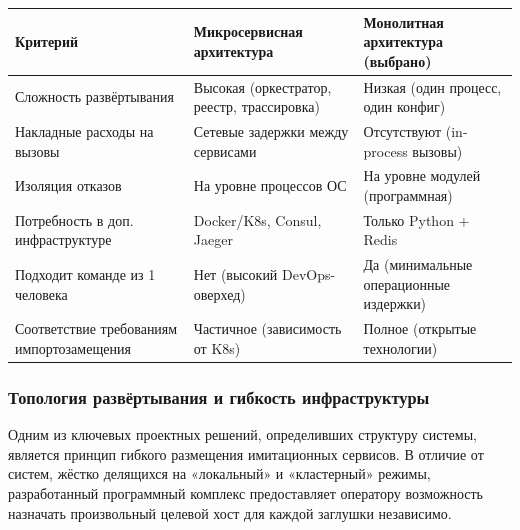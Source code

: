 \documentclass[
]{article}
\newcounter{none} %
\begin{document}
{\def\LTcaptype{none} %
\begin{longtable}[]{@{}
  >{\raggedright\arraybackslash}p{}
  >{\raggedright\arraybackslash}p{}
  >{\raggedright\arraybackslash}p{}@{}}
\toprule\noalign{}
\begin{minipage}[b]{\linewidth}\centering
\textbf{Критерий}
\end{minipage} & \begin{minipage}[b]{\linewidth}\centering
\textbf{Микросервисная архитектура}
\end{minipage} & \begin{minipage}[b]{\linewidth}\centering
\textbf{Монолитная архитектура (выбрано)}
\end{minipage} \\
\midrule\noalign{}
\endhead
\bottomrule\noalign{}
\endlastfoot
Сложность развёртывания & Высокая (оркестратор, реестр, трассировка) &
Низкая (один процесс, один конфиг) \\
Накладные расходы на вызовы & Сетевые задержки между сервисами &
Отсутствуют (in-process вызовы) \\
Изоляция отказов & На уровне процессов ОС & На уровне модулей
(программная) \\
Потребность в доп. инфраструктуре & Docker/K8s, Consul, Jaeger & Только
Python + Redis \\
Подходит команде из 1 человека & Нет (высокий DevOps-оверхед) & Да
(минимальные операционные издержки) \\
Соответствие требованиям импортозамещения & Частичное (зависимость от
K8s) & Полное (открытые технологии) \\
\end{longtable}
}

\subsubsection{Топология развёртывания и гибкость
инфраструктуры}\label{ux442ux43eux43fux43eux43bux43eux433ux438ux44f-ux440ux430ux437ux432ux451ux440ux442ux44bux432ux430ux43dux438ux44f-ux438-ux433ux438ux431ux43aux43eux441ux442ux44c-ux438ux43dux444ux440ux430ux441ux442ux440ux443ux43aux442ux443ux440ux44b}

Одним из ключевых проектных решений, определивших структуру системы,
является принцип гибкого размещения имитационных сервисов. В отличие от
систем, жёстко делящихся на «локальный» и «кластерный» режимы,
разработанный программный комплекс предоставляет оператору возможность
назначать произвольный целевой хост для каждой заглушки независимо.
\end{document}
